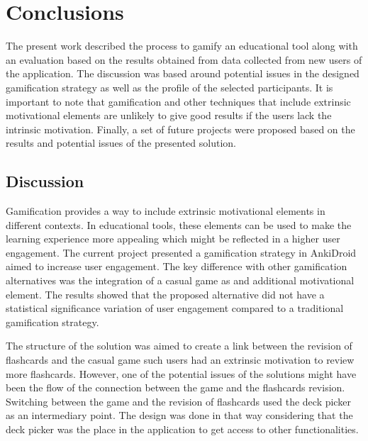 
\chapter{Conclusions} %

\label{conc} %


The present work described the process to gamify an educational tool along with an evaluation based on the results obtained from data collected from new users of the application. The discussion was based around potential issues in the designed gamification strategy as well as the profile of the selected participants. It is important to note that gamification and other techniques that include extrinsic motivational elements are unlikely to give good results if the users lack the intrinsic motivation. Finally, a set of future projects were proposed based on the results and potential issues of the presented solution.

\section{Discussion}
Gamification provides a way to include extrinsic motivational elements in different contexts. In educational tools, these elements can be used to make the learning experience more appealing which might be reflected in a higher user engagement. The current project presented a gamification strategy in AnkiDroid aimed to increase user engagement. The key difference with other gamification alternatives was the integration of a casual game as and additional motivational element. The results showed that the proposed alternative did not have a statistical significance variation of user engagement compared to a traditional gamification strategy.

The structure of the solution was aimed to create a link between the revision of flashcards and the casual game such users had an extrinsic motivation to review more flashcards. However, one of the potential issues of the solutions might have been the flow of the connection between the game and the flashcards revision. Switching between the game and the revision of flashcards used the deck picker as an intermediary point. The design was done in that way considering that the deck picker was the place in the application to get access to other functionalities.

